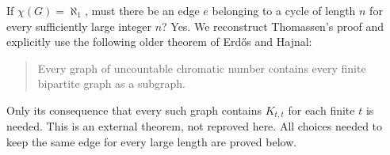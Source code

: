 If $\chi(G)=\aleph_1$, must there be an edge $e$ belonging to a cycle of length $n$ for every sufficiently large integer $n$? Yes. We reconstruct Thomassen's proof and explicitly use the following older theorem of Erd\H{o}s and Hajnal:
\begin{quote}
Every graph of uncountable chromatic number contains every finite bipartite graph as a subgraph.
\end{quote}
Only its consequence that every such graph contains $K_{t,t}$ for each finite $t$ is needed. This is an external theorem, not reproved here. All choices needed to keep the same edge for every large length are proved below.

